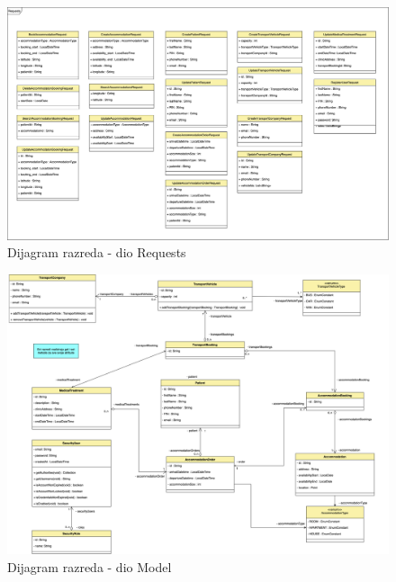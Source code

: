 			\begin{figure}[H]
				\includegraphics[scale=0.08]{slike/arhitektura_requests_class_diagram.png} %
				\centering
				\caption{Dijagram razreda - dio Requests}
				\label{fig:arhitektura_requests_class_diagram}
			\end{figure}
			
			\begin{figure}[H]
				\includegraphics[scale=0.08]{slike/arhitektura_model_class_diagram_v2.png} %
				\centering
				\caption{Dijagram razreda - dio Model}
				\label{fig:arhitektura_model_class_diagram}
			\end{figure}
			
			
			
			\eject
		
